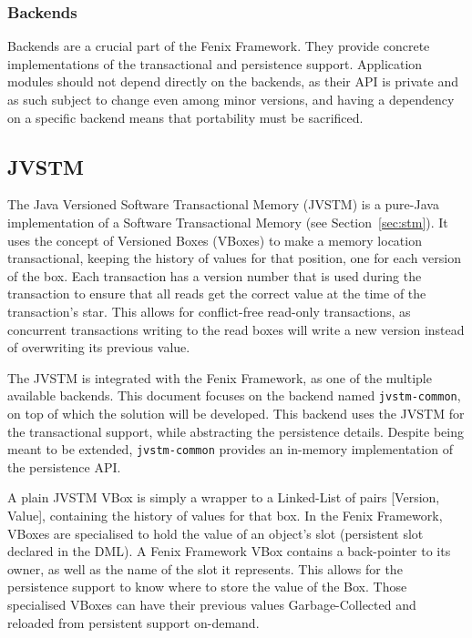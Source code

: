 \documentclass{llncs}
\begin{document}
\subsubsection{Backends}

Backends are a crucial part of the Fenix Framework. They provide
concrete implementations of the transactional and persistence
support. Application modules should not depend directly on the
backends, as their API is private and as such subject to change even
among minor versions, and having a dependency on a specific backend
means that portability must be sacrificed.

\subsection{JVSTM}
\label{sec:jvstm}

The Java Versioned Software Transactional Memory (JVSTM)
\cite{cachopo2006versioned} is a pure-Java implementation of a
Software Transactional Memory (see Section~\ref{sec:stm}).  It uses
the concept of Versioned Boxes (VBoxes) to make a memory location
transactional, keeping the history of values for that position, one
for each version of the box. Each transaction has a version number
that is used during the transaction to ensure that all reads get the
correct value at the time of the transaction's star. This allows for
conflict-free read-only transactions, as concurrent transactions
writing to the read boxes will write a new version instead of
overwriting its previous value.

The JVSTM is integrated with the Fenix Framework, as one of the
multiple available backends. This document focuses on the backend
named \texttt{jvstm-common}, on top of which the solution will be
developed. This backend uses the JVSTM for the transactional support,
while abstracting the persistence details. Despite being meant to be
extended, \texttt{jvstm-common} provides an in-memory implementation
of the persistence API.

A plain JVSTM VBox is simply a wrapper to a Linked-List of pairs
[Version, Value], containing the history of values for that box. In
the Fenix Framework, VBoxes are specialised to hold the value of an
object's slot (persistent slot declared in the DML). A Fenix
Framework VBox contains a back-pointer to its owner, as well as the
name of the slot it represents. This allows for the persistence
support to know where to store the value of the Box.  Those
specialised VBoxes can have their previous values Garbage-Collected
and reloaded from persistent support on-demand.
\end{document}

